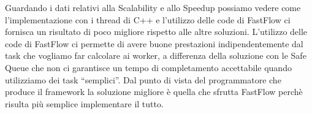 \documentclass[12pt]{report}
\begin{document}
Guardando i dati relativi alla Scalability e allo Speedup possiamo vedere come l'implementazione con i thread di C++ e l'utilizzo delle code di FastFlow ci fornisca un risultato di poco migliore rispetto alle altre soluzioni. 
L'utilizzo delle code di FastFlow ci permette di avere buone prestazioni indipendentemente dal task che vogliamo far calcolare ai worker, a differenza della soluzione con le Safe Queue che non ci garantisce un tempo di completamento accettabile quando utilizziamo dei task ``semplici''.
Dal punto di vista del programmatore che produce il framework la soluzione migliore è quella che sfrutta FastFlow perchè risulta più semplice implementare il tutto.

\newpage


\end{document}
